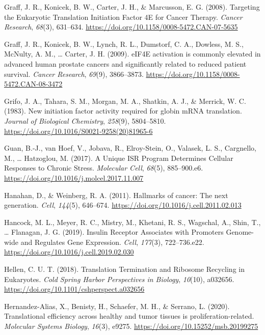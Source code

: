 \documentclass[12pt,openany]{book}
\begin{document}
\hypertarget{ref-Graff2008}{}
Graff, J. R., Konicek, B. W., Carter, J. H., \& Marcusson, E. G. (2008).
Targeting the Eukaryotic Translation Initiation Factor 4E for Cancer
Therapy. \emph{Cancer Research}, \emph{68}(3), 631--634.
\url{https://doi.org/10.1158/0008-5472.CAN-07-5635}

\hypertarget{ref-Graff2009}{}
Graff, J. R., Konicek, B. W., Lynch, R. L., Dumstorf, C. A., Dowless, M.
S., McNulty, A. M., \ldots{} Carter, J. H. (2009). eIF4E activation is
commonly elevated in advanced human prostate cancers and significantly
related to reduced patient survival. \emph{Cancer Research},
\emph{69}(9), 3866--3873.
\url{https://doi.org/10.1158/0008-5472.CAN-08-3472}

\hypertarget{ref-Grifo1983}{}
Grifo, J. A., Tahara, S. M., Morgan, M. A., Shatkin, A. J., \& Merrick,
W. C. (1983). New initiation factor activity required for globin mRNA
translation. \emph{Journal of Biological Chemistry}, \emph{258}(9),
5804--5810. \url{https://doi.org/10.1016/S0021-9258(20)81965-6}

\hypertarget{ref-Guan2017}{}
Guan, B.-J., van Hoef, V., Jobava, R., Elroy-Stein, O., Valasek, L. S.,
Cargnello, M., \ldots{} Hatzoglou, M. (2017). A Unique ISR Program
Determines Cellular Responses to Chronic Stress. \emph{Molecular Cell},
\emph{68}(5), 885--900.e6.
\url{https://doi.org/10.1016/j.molcel.2017.11.007}

\hypertarget{ref-Hanahan2011}{}
Hanahan, D., \& Weinberg, R. A. (2011). Hallmarks of cancer: The next
generation. \emph{Cell}, \emph{144}(5), 646--674.
\url{https://doi.org/10.1016/j.cell.2011.02.013}

\hypertarget{ref-Hancock2019}{}
Hancock, M. L., Meyer, R. C., Mistry, M., Khetani, R. S., Wagschal, A.,
Shin, T., \ldots{} Flanagan, J. G. (2019). Insulin Receptor Associates
with Promoters Genome-wide and Regulates Gene Expression. \emph{Cell},
\emph{177}(3), 722--736.e22.
\url{https://doi.org/10.1016/j.cell.2019.02.030}

\hypertarget{ref-Hellen2018}{}
Hellen, C. U. T. (2018). Translation Termination and Ribosome Recycling
in Eukaryotes. \emph{Cold Spring Harbor Perspectives in Biology},
\emph{10}(10), a032656.
\url{https://doi.org/10.1101/cshperspect.a032656}

\hypertarget{ref-Hernandez-Alias2020}{}
Hernandez-Alias, X., Benisty, H., Schaefer, M. H., \& Serrano, L.
(2020). Translational efficiency across healthy and tumor tissues is
proliferation-related. \emph{Molecular Systems Biology}, \emph{16}(3),
e9275. \url{https://doi.org/10.15252/msb.20199275}
\end{document}
